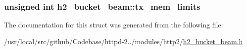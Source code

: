 \subsubsection[{\texorpdfstring{tx\+\_\+mem\+\_\+limits}{tx_mem_limits}}]{\setlength{\rightskip}{0pt plus 5cm}unsigned {\bf int} h2\+\_\+bucket\+\_\+beam\+::tx\+\_\+mem\+\_\+limits}\hypertarget{structh2__bucket__beam_aedb697d0452b057d99490dc49d97d7f5}{}\label{structh2__bucket__beam_aedb697d0452b057d99490dc49d97d7f5}


The documentation for this struct was generated from the following file\+:\begin{DoxyCompactItemize}
\item 
/usr/local/src/github/\+Codebase/httpd-\/2../modules/http2/\hyperlink{h2__bucket__beam_8h}{h2\+\_\+bucket\+\_\+beam.\+h}\end{DoxyCompactItemize}

